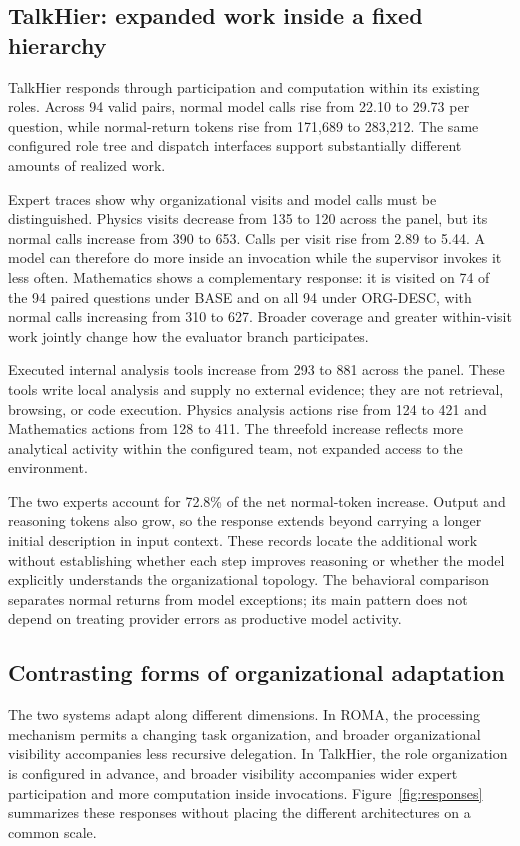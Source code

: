 \documentclass[10pt,letterpaper,twocolumn]{article}
\begin{document}
\subsection{TalkHier: expanded work inside a fixed hi\-er\-ar\-chy}
TalkHier responds through par\-tic\-i\-pa\-tion and com\-pu\-ta\-tion within its ex\-ist\-ing roles. Across 94 valid pairs, normal mod\-el calls rise from 22.10 to 29.73 per ques\-tion, while normal-return tokens rise from 171,689 to 283,212. The same configured role tree and dispatch in\-ter\-faces support substantially dif\-fer\-ent amounts of realized work.

Expert traces show why or\-ga\-ni\-za\-tion\-al visits and mod\-el calls must be distinguished. Phys\-ics visits decrease from 135 to 120 across the panel, but its normal calls increase from 390 to 653. Calls per visit rise from 2.89 to 5.44. A mod\-el can therefore do more inside an invocation while the supervisor invokes it less often. Mathematics shows a complementary response: it is visited on 74 of the 94 paired questions under BASE and on all 94 under ORG-\allowbreak{}DESC, with normal calls increasing from 310 to 627. Broader coverage and greater within-visit work jointly change how the evaluator branch participates.

Executed in\-ter\-nal analysis tools increase from 293 to 881 across the panel. These tools write local analysis and supply no external evidence; they are not retrieval, browsing, or code ex\-e\-cu\-tion. Phys\-ics analysis actions rise from 124 to 421 and Mathematics actions from 128 to 411. The threefold increase reflects more analytical activity within the configured team, not expanded access to the environment.

The two experts account for 72.8\% of the net normal-token increase. Output and reasoning tokens also grow, so the response extends beyond carrying a longer initial de\-scrip\-tion in input con\-text. These re\-cords locate the additional work without establishing whether each step improves reasoning or whether the mod\-el explicitly understands the or\-ga\-ni\-za\-tion\-al topo\-lo\-gy. The behavioral comparison separates normal returns from mod\-el exceptions; its main pattern does not depend on treating prov\-id\-er errors as productive mod\-el activity.

\subsection{Contrasting forms of or\-ga\-ni\-za\-tion\-al adaptation}
The two sys\-tems adapt along dif\-fer\-ent dimensions. In ROMA, the processing mech\-a\-nism permits a changing task or\-ga\-ni\-za\-tion, and broad\-er or\-ga\-ni\-za\-tion\-al vis\-i\-bil\-i\-ty accompanies less re\-cur\-sive del\-e\-ga\-tion. In TalkHier, the role or\-ga\-ni\-za\-tion is configured in advance, and broad\-er vis\-i\-bil\-i\-ty accompanies wider expert par\-tic\-i\-pa\-tion and more com\-pu\-ta\-tion inside in\-vo\-ca\-tions. Figure~\ref{fig:responses} summarizes these responses without placing the dif\-fer\-ent ar\-chi\-tec\-tures on a common scale.
\end{document}
